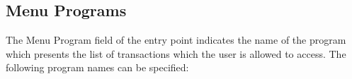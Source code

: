 \documentclass[letterpaper,10pt,english]{sphinxmanual}
\begin{document}
\ignorespaces 

\subsection{Menu Programs}
\label{\detokenize{connectivity_guide:menu-programs}}\label{\detokenize{connectivity_guide:index-111}}
\sphinxAtStartPar
The Menu Program field of the entry point indicates the name of the program which presents the list of transactions which the user is allowed to access. The following program names can be specified:
\end{document}
